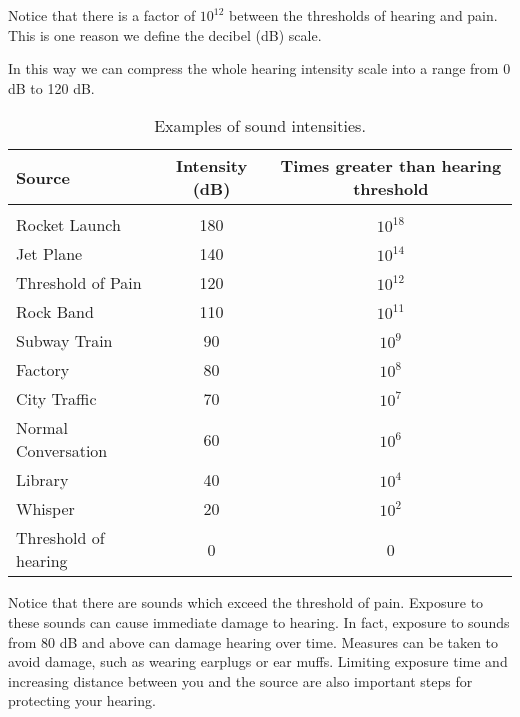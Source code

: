 Notice that there is a factor of $10^{12}$ between the thresholds of
hearing and pain. This is one reason we define the decibel (dB) scale.


In this way we can compress the whole hearing intensity scale into a
range from 0 dB to 120 dB.

\begin{table}[H]
\begin{center}
\caption{Examples of sound intensities.}
\label{p:wsl:s11:intensity}
\begin{tabular}{|l|c|c|}\hline
\textbf{Source}&\textbf{Intensity} (dB) & \textbf{Times greater than hearing threshold}\\\hline
& & \\
Rocket Launch &180 & $10^{18}$\\
Jet Plane & 140 & $10^{14}$ \\
Threshold of Pain & 120 & $10^{12}$\\
Rock Band & 110 & $10^{11}$\\
Subway Train & 90 & $10^{9}$\\
Factory & 80 & $10^{8}$\\
City Traffic & 70 & $10^{7}$\\
Normal Conversation & 60 & $10^{6}$\\
Library & 40 & $10^{4}$\\
Whisper & 20 & $10^{2}$\\
Threshold of hearing & 0 & 0\\
\hline
\end{tabular}
\end{center}
\end{table}

Notice that there are sounds which exceed the threshold
of pain. Exposure to these sounds can cause immediate damage to hearing.
In fact, exposure to sounds from
80 dB and above can damage hearing over time. Measures
can be taken to avoid damage, such as wearing earplugs
or ear muffs. Limiting exposure time and
increasing distance between you and the source are also
important steps for protecting your hearing.


